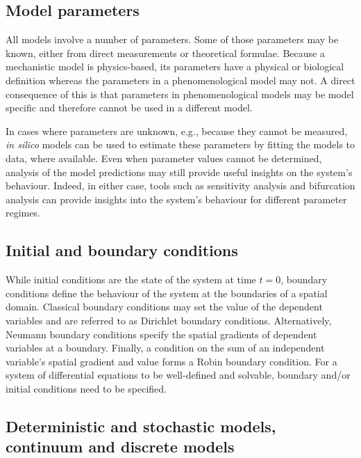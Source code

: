 \documentclass{article}
\begin{document}
\subsection{Model parameters}
All models involve a number of parameters.
Some of those parameters may be known, either from direct measurements or theoretical formulae.
Because a mechanistic model is physics-based, its parameters have a physical or biological definition whereas the parameters in a phenomenological model may not.
A direct consequence of this is that parameters in phenomenological models may be model specific and therefore cannot be used in a different model.

In cases where parameters are unknown, e.g., because they cannot be measured, \textit{in silico} models can be used to estimate these parameters by fitting the models to data, where available.
Even when parameter values cannot be determined, analysis of the model predictions may still provide useful insights on the system's behaviour.
Indeed, in either case, tools such as sensitivity analysis and bifurcation analysis can provide insights into the system's behaviour for different parameter regimes.


\subsection{Initial and boundary conditions}

While initial conditions are the state of the system at time $t=0$, boundary conditions define the behaviour of the system at the boundaries of a spatial domain.
Classical boundary conditions may set the value of the dependent variables and are referred to as Dirichlet boundary conditions.
Alternatively, Neumann boundary conditions specify the spatial gradients of dependent variables at a boundary.
Finally, a condition on the sum of an independent variable's spatial gradient and value forms a Robin boundary condition.
For a system of differential equations to be well-defined and solvable, boundary and/or initial conditions need to be specified.

\subsection{Deterministic and stochastic models, continuum and discrete models}
\end{document}
